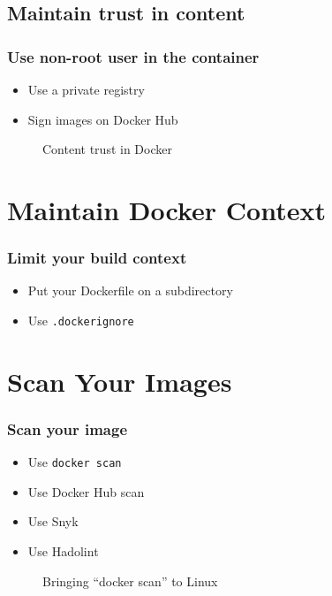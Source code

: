 \documentclass[10pt, compress]{beamer}
\begin{document}
\subsection{Maintain trust in content}

\begin{frame}[fragile]
  \frametitle{Use non-root user in the container}
  
  \begin{itemize}
      \item Use a private registry
      \item Sign images on Docker Hub
  \end{itemize}
  
  \begin{figure}
      \centering
      \caption{Content trust in Docker}
  \end{figure}
\end{frame}

\section{Maintain Docker Context}

\begin{frame}[fragile]
  \frametitle{Limit your build context}
  
  \begin{itemize}
      \item Put your Dockerfile on a subdirectory
      \item Use \texttt{.dockerignore}
  \end{itemize}
\end{frame}

\section{Scan Your Images}

\begin{frame}[fragile]
  \frametitle{Scan your image}
  
  \begin{itemize}
      \item Use \texttt{docker scan}
      \item Use Docker Hub scan
      \item Use Snyk
      \item Use Hadolint
  \end{itemize}
  
  \begin{figure}
      \centering
      \caption{Bringing ``docker scan'' to Linux}
  \end{figure}
\end{frame}

\end{document}
